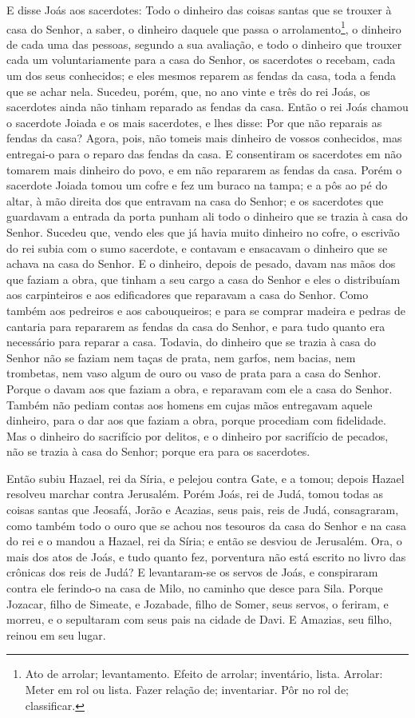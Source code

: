 E disse Joás aos sacerdotes: Todo o dinheiro das coisas santas que
se trouxer à casa do Senhor, a saber, o dinheiro daquele que passa o
arrolamento\footnote{Ato de arrolar; levantamento. Efeito de
arrolar; inventário, lista. Arrolar: Meter em rol ou lista. Fazer
relação de; inventariar. Pôr no rol de; classificar.}, o dinheiro de
cada uma das pessoas, segundo a sua avaliação, e todo o dinheiro que
trouxer cada um voluntariamente para a casa do Senhor, os
sacerdotes o recebam, cada um dos seus conhecidos; e eles mesmos
reparem as fendas da casa, toda a fenda que se achar nela.
Sucedeu, porém, que, no ano vinte e três do rei Joás, os
sacerdotes ainda não tinham reparado as fendas da casa. Então o
rei Joás chamou o sacerdote Joiada e os mais sacerdotes, e lhes
disse: Por que não reparais as fendas da casa? Agora, pois, não
tomeis mais dinheiro de vossos conhecidos, mas entregai-o para o
reparo das fendas da casa. E consentiram os sacerdotes em não
tomarem mais dinheiro do povo, e em não repararem as fendas da casa.
Porém o sacerdote Joiada tomou um cofre e fez um buraco na
tampa; e a pôs ao pé do altar, à mão direita dos que entravam na
casa do Senhor; e os sacerdotes que guardavam a entrada da porta
punham ali todo o dinheiro que se trazia à casa do Senhor.
Sucedeu que, vendo eles que já havia muito dinheiro no cofre,
o escrivão do rei subia com o sumo sacerdote, e contavam e ensacavam
o dinheiro que se achava na casa do Senhor. E o dinheiro,
depois de pesado, davam nas mãos dos que faziam a obra, que tinham a
seu cargo a casa do Senhor e eles o distribuíam aos carpinteiros e
aos edificadores que reparavam a casa do Senhor. Como também
aos pedreiros e aos cabouqueiros; e para se comprar madeira e pedras
de cantaria para repararem as fendas da casa do Senhor, e para tudo
quanto era necessário para reparar a casa. Todavia, do
dinheiro que se trazia à casa do Senhor não se faziam nem taças de
prata, nem garfos, nem bacias, nem trombetas, nem vaso algum de ouro
ou vaso de prata para a casa do Senhor. Porque o davam aos
que faziam a obra, e reparavam com ele a casa do Senhor.
Também não pediam contas aos homens em cujas mãos entregavam
aquele dinheiro, para o dar aos que faziam a obra, porque procediam
com fidelidade. Mas o dinheiro do sacrifício por delitos, e o
dinheiro por sacrifício de pecados, não se trazia à casa do Senhor;
porque era para os sacerdotes.

Então subiu Hazael, rei da Síria, e pelejou contra Gate, e a
tomou; depois Hazael resolveu marchar contra Jerusalém. Porém
Joás, rei de Judá, tomou todas as coisas santas que Jeosafá, Jorão e
Acazias, seus pais, reis de Judá, consagraram, como também todo o
ouro que se achou nos tesouros da casa do Senhor e na casa do rei e
o mandou a Hazael, rei da Síria; e então se desviou de Jerusalém.
Ora, o mais dos atos de Joás, e tudo quanto fez, porventura
não está escrito no livro das crônicas dos reis de Judá? E
levantaram-se os servos de Joás, e conspiraram contra ele ferindo-o
na casa de Milo, no caminho que desce para Sila. Porque
Jozacar, filho de Simeate, e Jozabade, filho de Somer, seus servos,
o feriram, e morreu, e o sepultaram com seus pais na cidade de Davi.
E Amazias, seu filho, reinou em seu lugar.

